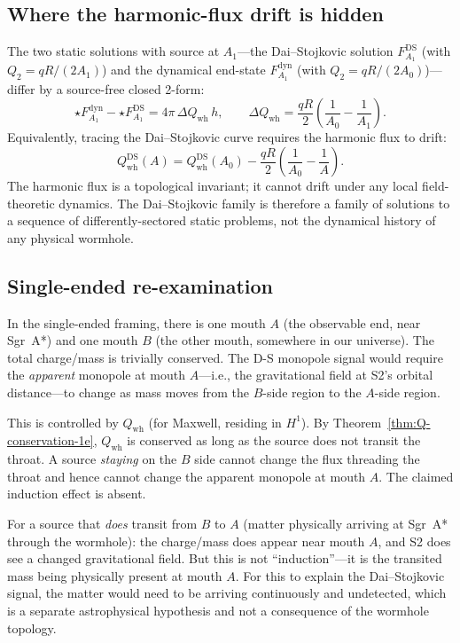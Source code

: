 \documentclass[aps,prd,onecolumn,nofootinbib,superscriptaddress]{revtex4-2}
\begin{document}
\subsection{Where the harmonic-flux drift is hidden}

The two static solutions with source at $A_1$---the Dai--Stojkovic solution
$F_{A_1}^{\mathrm{DS}}$ (with $Q_2=qR/(2A_1)$) and the dynamical end-state
$F_{A_1}^{\mathrm{dyn}}$ (with $Q_2=qR/(2A_0)$)---differ by a source-free
closed 2-form:
\begin{equation}
\star F_{A_1}^{\mathrm{dyn}} - \star F_{A_1}^{\mathrm{DS}}
= 4\pi\,\Delta Q_{\mathrm{wh}}\,h, \qquad
\Delta Q_{\mathrm{wh}} = \frac{qR}{2}\!\left(\frac{1}{A_0}-\frac{1}{A_1}\right).
\end{equation}
Equivalently, tracing the Dai--Stojkovic curve requires the harmonic flux to
drift:
\begin{equation}
Q_{\mathrm{wh}}^{\mathrm{DS}}(A) = Q_{\mathrm{wh}}^{\mathrm{DS}}(A_0)
  - \frac{qR}{2}\!\left(\frac{1}{A_0}-\frac{1}{A}\right).
\end{equation}
The harmonic flux is a topological invariant; it cannot drift under any local
field-theoretic dynamics.  The Dai--Stojkovic family is therefore a family of
solutions to a sequence of differently-sectored static problems, not the
dynamical history of any physical wormhole.

\subsection{Single-ended re-examination}

In the single-ended framing, there is one mouth $A$ (the observable end, near
Sgr~A*) and one mouth $B$ (the other mouth, somewhere in our universe).  The
total charge/mass is trivially conserved.  The D-S monopole signal would
require the \emph{apparent} monopole at mouth $A$---i.e., the gravitational
field at S2's orbital distance---to change as mass moves from the $B$-side
region to the $A$-side region.

This is controlled by $Q_{\mathrm{wh}}$ (for Maxwell, residing in $H^1$).
By Theorem~\ref{thm:Q-conservation-1e}, $Q_{\mathrm{wh}}$ is conserved as long
as the source does not transit the throat.  A source \emph{staying} on the $B$
side cannot change the flux threading the throat and hence cannot change the
apparent monopole at mouth $A$.  The claimed induction effect is absent.

For a source that \emph{does} transit from $B$ to $A$ (matter physically
arriving at Sgr~A* through the wormhole): the charge/mass does appear near
mouth $A$, and S2 does see a changed gravitational field.  But this is not
``induction''---it is the transited mass being physically present at mouth $A$.
For this to explain the Dai--Stojkovic signal, the matter would need to be
arriving continuously and undetected, which is a separate astrophysical
hypothesis and not a consequence of the wormhole topology.
\end{document}
